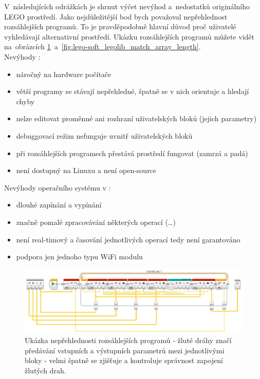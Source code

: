 V~následujících odrážkách je shrnut výčet nevýhod a~nedostatků originálního LEGO prostředí. 
Jako nejdůležitější bod bych považoval nepřehlednost rozsáhlejších programů. %
To je pravděpodobně hlavní důvod proč uživatelé \legoM{} vyhledávají alternativní prostředí. 
Ukázku rozsáhlejších programů můžete vidět na~obrázcích \ref{fig:lego-soft_legolib_converge_array}~a~\ref{fig:lego-soft_legolib_match_array_length}.\\

Nevýhody \legoSW:

\renewcommand{\labelitemi}{$-$} %
\begin{itemize}[noitemsep]\itemsep2pt
	\item náročný na hardware počítače
	\item větší programy se stávají nepřehledné, špatně se v nich orientuje a hledají chyby
	\item nelze editovat proměnné ani rozhraní uživatelských bloků (jejich parametry)
	\item debuggovací režim nefunguje uvnitř uživatelských bloků
	\item při rozsáhlejších programech přestává prostředí fungovat (zamrzá a padá)
	\item není dostupný na Linuxu a není open-source
\end{itemize}

Nevýhody operačního systému v :
\begin{itemize}[noitemsep]\itemsep2pt
	\item dlouhé zapínání a vypínání
	\item značně pomalé zpracovávání některých operací (\dots) %
	\item není real-timový a časování jednotlivých operací tedy není garantováno
	\item podpora jen jednoho typu WiFi modulu
\end{itemize}
\renewcommand{\labelitemi}{$\bullet$} %

\begin{figure}[h]
	\centering
	\includegraphics[width=\textwidth]{images/lego-soft_legolib_converge_array.png}
	\caption[Ukázka nepřehlednosti rozsáhlejších programů]{Ukázka nepřehlednosti rozsáhlejších programů - žluté dráhy značí předávání vstupních a výstupních parametrů mezi jednotlivými bloky - velmi špatně se zjišťuje a kontroluje správnost zapojení žlutých drah.}
	\label{fig:lego-soft_legolib_converge_array}
\end{figure}
 
